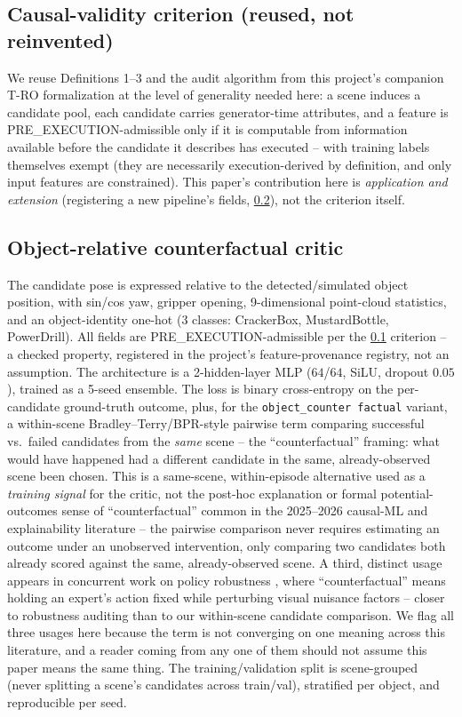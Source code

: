 \documentclass[journal]{IEEEtran}
\begin{document}
\subsection{Causal-validity criterion (reused, not reinvented)}
\label{sec:criterion}

We reuse Definitions 1--3 and the audit algorithm from this project's
companion T-RO formalization at the level of generality needed here:
a scene induces a candidate pool, each candidate carries generator-time
attributes, and a feature is PRE\_EXECUTION-admissible only if it is
computable from information available before the candidate it describes
has executed -- with training labels themselves exempt (they are
necessarily execution-derived by definition, and only input features are
constrained). This paper's contribution here is \emph{application and
extension} (registering a new pipeline's fields, \cref{sec:critic}), not
the criterion itself.

\subsection{Object-relative counterfactual critic}
\label{sec:critic}

The candidate pose is expressed relative to the detected/simulated object
position, with sin/cos yaw, gripper opening, 9-dimensional point-cloud
statistics, and an object-identity one-hot (3 classes: CrackerBox,
MustardBottle, PowerDrill). All fields are PRE\_EXECUTION-admissible per
the \cref{sec:criterion} criterion -- a checked property, registered in
the project's feature-provenance registry, not an assumption. The
architecture is a 2-hidden-layer MLP ($64$/$64$, SiLU, dropout $0.05$),
trained as a 5-seed ensemble. The loss is binary cross-entropy on the
per-candidate ground-truth outcome, plus, for the \texttt{object\_counter\-
factual} variant, a within-scene Bradley--Terry/BPR-style pairwise term
comparing successful vs.\ failed candidates from the \emph{same} scene --
the ``counterfactual'' framing: what would have happened had a different
candidate in the same, already-observed scene been chosen. This is a
same-scene, within-episode alternative used as a \emph{training signal} for
the critic, not the post-hoc explanation or formal potential-outcomes sense
of ``counterfactual'' common in the 2025--2026 causal-ML and
explainability literature -- the pairwise comparison never requires
estimating an outcome under an unobserved intervention, only comparing two
candidates both already scored against the same, already-observed scene. A
third, distinct usage appears in concurrent work on policy robustness
\cite{cfnbc2607}, where ``counterfactual'' means holding an expert's action
fixed while perturbing visual nuisance factors -- closer to robustness
auditing than to our within-scene candidate comparison. We flag all three
usages here because the term is not converging on one meaning across this
literature, and a reader coming from any one of them should not assume
this paper means the same thing.
The training/validation split is scene-grouped (never splitting a scene's
candidates across train/val), stratified per object, and reproducible per
seed.
\end{document}
